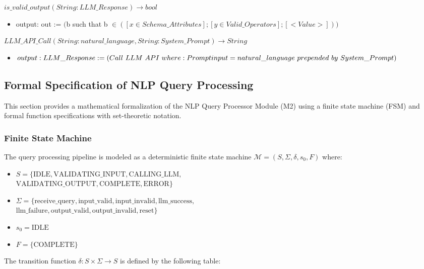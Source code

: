 \documentclass[12pt, titlepage]{article}
\begin{document}
\noindent $is\_valid\_output(String: LLM\_Response) \rightarrow bool$
\begin{itemize}
\item output: out := $($b such that b $\in ([x \in Schema\_Attributes];[y \in Valid\_Operators];[<Value>]))$
\end{itemize}

\noindent $LLM\_API\_Call(String: natural\_language, String: System\_Prompt) \rightarrow String$
\begin{itemize}
\item $output: LLM\_Response := (Call~LLM~API~where: \\ Prompt input = natural\_language~prepended~by~System\_Prompt)$
\end{itemize}




\subsection{Formal Specification of NLP Query Processing}

This section provides a mathematical formalization of the NLP Query Processor Module (M2) using a finite state machine (FSM) and formal function specifications with set-theoretic notation.

\subsubsection{Finite State Machine}

The query processing pipeline is modeled as a deterministic finite state machine $\mathcal{M} = (S, \Sigma, \delta, s_0, F)$ where:

\begin{itemize}
  \item $S = \{\text{IDLE}, \text{VALIDATING\_INPUT}, \text{CALLING\_LLM},$ \\
        $\text{VALIDATING\_OUTPUT}, \text{COMPLETE}, \text{ERROR}\}$
  \item $\Sigma = \{\text{receive\_query}, \text{input\_valid}, \text{input\_invalid}, \text{llm\_success},$ \\
        $\text{llm\_failure}, \text{output\_valid}, \text{output\_invalid}, \text{reset}\}$
  \item $s_0 = \text{IDLE}$
  \item $F = \{\text{COMPLETE}\}$
\end{itemize}

The transition function $\delta : S \times \Sigma \rightarrow S$ is defined by the following table:
\end{document}
